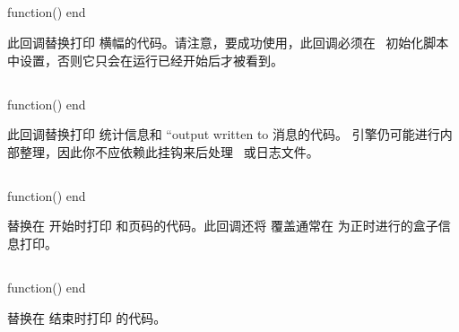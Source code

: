 \subsection{}


\begin{typing}
function()
end
\end{typing}

此回调替换打印 \LUATEX 横幅的代码。请注意，要成功使用，此回调必须在
\LUA\ 初始化脚本中设置，否则它只会在运行已经开始后才被看到。

\subsection{}


\begin{typing}
function()
end
\end{typing}

此回调替换打印 \LUATEX 统计信息和 ``output written to 消息的代码。
引擎仍可能进行内部整理，因此你不应依赖此挂钩来后处理 \PDF\ 或日志文件。

\subsection{}


\begin{typing}
function()
end
\end{typing}

替换在  开始时打印 \type {[} 和页码的代码。此回调还将
覆盖通常在  为正时进行的盒子信息打印。

\subsection{}


\begin{typing}
function()
end
\end{typing}

替换在  结束时打印 \type {]} 的代码。

\subsection{}

